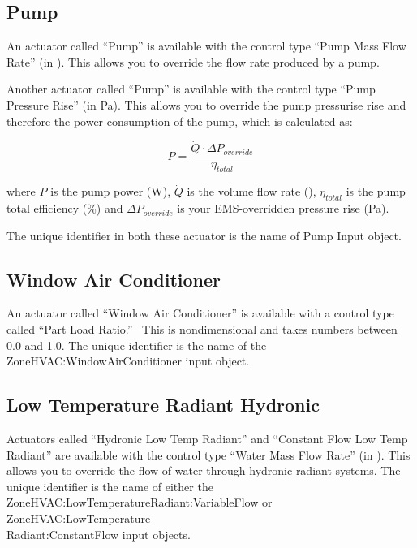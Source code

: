 \subsection{Pump}\label{pump}

An actuator called ``Pump'' is available with the control type ``Pump Mass Flow Rate'' (in \si{\massFlowRate}). This allows you to override the flow rate produced by a pump.

Another actuator called ``Pump'' is available with the control type ``Pump Pressure Rise'' (in \si{\pascal}). This allows you to override the pump pressurise rise and therefore the power consumption of the pump, which is calculated as:

\begin{equation}
    P = \frac{\dot{Q} \cdot \Delta P_{override}}{\eta_{total}}
\end{equation}

where $P$ is the pump power (\si{\watt}), $\dot{Q}$ is the volume flow rate (\si{\volumeFlowRate}), $\eta_{total}$ is the pump total efficiency (\%)
and $\Delta P_{override}$ is your EMS-overridden pressure rise (\si{\pascal}).

The unique identifier in both these actuator is the name of Pump Input object.

\subsection{Window Air Conditioner}\label{window-air-conditioner}

An actuator called ``Window Air Conditioner'' is available with a control type called ``Part Load Ratio.''~ This is nondimensional and takes numbers between 0.0 and 1.0. The unique identifier is the name of the ZoneHVAC:WindowAirConditioner input object.

\subsection{Low Temperature Radiant Hydronic}\label{low-temperature-radiant-hydronic}

Actuators called ``Hydronic Low Temp Radiant'' and ``Constant Flow Low Temp Radiant'' are available with the control type ``Water Mass Flow Rate'' (in \si{\massFlowRate}). This allows you to override the flow of water through hydronic radiant systems. The unique identifier is the name of either the ZoneHVAC:LowTemperatureRadiant:VariableFlow or ZoneHVAC:LowTemperature\\
Radiant:ConstantFlow input objects.

